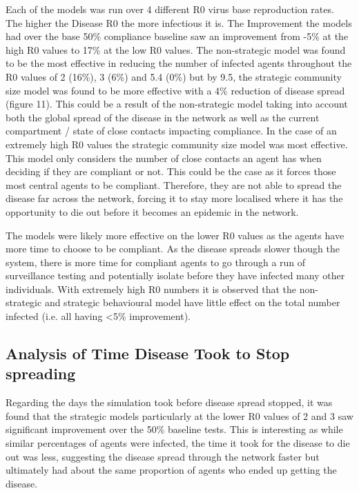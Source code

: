 \documentclass{article}
\begin{document}
Each of the models was run over 4 different R0 virus base reproduction rates. The higher the Disease R0 the more infectious it is. The Improvement the models had over the base 50\% compliance baseline saw an improvement from -5\% at the high R0 values to 17\% at the low R0 values. The non-strategic model was found to be the most effective in reducing the number of infected agents throughout the R0 values of 2 (16\%), 3 (6\%) and 5.4 (0\%) but by 9.5, the strategic community size model was found to be more effective with a 4\% reduction of disease spread (figure 11). This could be a result of the non-strategic model taking into account both the global spread of the disease in the network as well as the current compartment / state of close contacts impacting compliance. In the case of an extremely high R0 values the strategic community size model was most effective.  This model only considers the number of close contacts an agent has when deciding if they are compliant or not. This could be the case as it forces those most central agents to be compliant. Therefore, they are not able to spread the disease far across the network, forcing it to stay more localised where it has the opportunity to die out before it becomes an epidemic in the network.\newline 

The models were likely more effective on the lower R0 values as the agents have more time to choose to be compliant. As the disease spreads slower though the system, there is more time for compliant agents to go through a run of surveillance testing and potentially isolate before they have infected many other individuals. With extremely high R0 numbers it is observed that the non-strategic and strategic behavioural model have little effect on the total number infected (i.e. all having <5\% improvement). 


\subsection{Analysis of Time Disease Took to Stop spreading}

Regarding the days the simulation took before disease spread stopped, it was found that the strategic models particularly at the lower R0 values of 2 and 3 saw significant improvement over the 50\% baseline tests. This is interesting as while similar percentages of agents were infected, the time it took for the disease to die out was less, suggesting the disease spread through the network faster but ultimately had about the same proportion of agents who ended up getting the disease.\newline 
\end{document}
